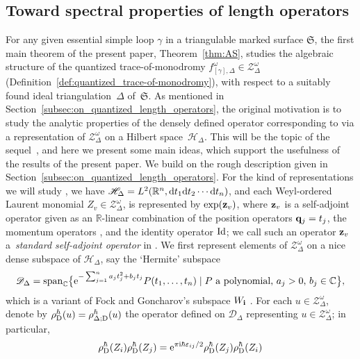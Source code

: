 \documentclass[pdftex]{sigma}
\numberwithin{equation}{section}
\theoremstyle{definition}
\begin{document}
\subsection{Toward spectral properties of length operators}
\label{subsec:toward_spectral_properties}
For any given essential simple loop $\gamma$ in a triangulable marked surface $\mathfrak{S}$, the first main theorem of the present paper, Theorem~\ref{thm:AS}, studies the algebraic structure of the quantized trace-of-monodromy $f^\omega_{[\gamma],\Delta} \in \mathcal{Z}^\omega_\Delta$ (Definition~\ref{def:quantized_trace-of-monodromy}), with respect to a suitably found ideal triangulation~$\Delta$ of~$\mathfrak{S}$. As mentioned in Section~\ref{subsec:on_quantized_length_operators}, the original motivation is to study the analytic properties of the densely defined operator corresponding to  via a representation of $\mathcal{Z}^\omega_\Delta$ on a Hilbert space~$\mathscr{H}_\Delta$. This will be the topic of the sequel~\cite{sequel}, and here we present some main ideas, which support the usefulness of the results of the present paper. We build on the rough description given in Section~\ref{subsec:on_quantized_length_operators}.
For the kind of representations we will study \cite{FG09, Kim_irreducible}, we have $\mathscr{H}_\Delta = L^2(\mathbb{R}^n, {\rm d}t_1 {\rm d}t_2\cdots {\rm d}t_n)$, and each Weyl-ordered Laurent monomial $Z_v \in \mathcal{Z}^\omega_\Delta$, is represented by $\exp({\bf z}_v)$, where ${\bf z}_v$ is a self-adjoint operator given as an $\mathbb{R}$-linear combination of the position operators ${\bf q}_j =t_j$, the momentum operators , and the identity operator ${\rm Id}$; we call such an operator ${\bf z}_v$ a~{\em standard self-adjoint operator} in \cite{sequel}. We first represent elements of $\mathcal{Z}^\omega_\Delta$ on a nice dense subspace of $\mathscr{H}_\Delta$, say the `Hermite' subspace
\begin{align}
\label{eq:our_Hermite_subspace}
\mathscr{D}_\Delta = {\rm span}_\mathbb{C}\bigl\{ {\rm e}^{- \sum_{j=1}^n a_j t_j^2 + b_j t_j} P(t_1,\dots,t_n) \mid \mbox{$P$ a polynomial, $a_j>0$, $b_j \in \mathbb{C}$}\bigr\},
\end{align}
which is a variant of Fock and Goncharov's subspace $W_{\bf i}$ \cite{FG09}. For each $u\in \mathcal{Z}^\omega_\Delta$, denote by $\rho^\hbar_{\rm D}(u) = \rho^\hbar_{\Delta;{\rm D}}(u)$ the operator defined on $\mathscr{D}_\Delta$ representing $u \in \mathcal{Z}^\omega_\Delta$; in particular, \[\rho^\hbar_{\rm D}(Z_i) \rho^\hbar_{\rm D}(Z_j) = {\rm e}^{\pi {\rm i} \hbar \varepsilon_{ij}/2} \rho^\hbar_{\rm D}(Z_j) \rho^\hbar_{\rm D}(Z_i)\]
\end{document}

